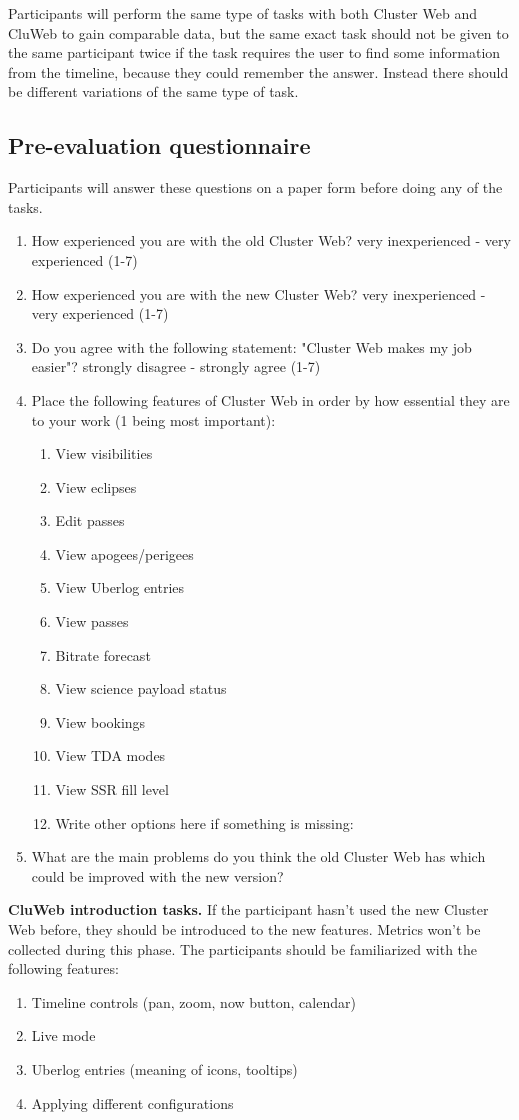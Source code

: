 Participants will perform the same type of tasks with both Cluster Web and CluWeb to gain comparable data, but the same exact task should not be given to the same participant twice if the task requires the user to find some information from the timeline, because they could remember the answer. Instead there should be different variations of the same type of task.

\subsection{Pre-evaluation questionnaire} \label{pre-evaluation}
Participants will answer these questions on a paper form before doing any of the tasks.
\begin{enumerate}
\item How experienced you are with the old Cluster Web? very inexperienced - very experienced (1-7)
\item How experienced you are with the new Cluster Web? very inexperienced - very experienced (1-7)
\item Do you agree with the following statement: "Cluster Web makes my job easier"? strongly disagree - strongly agree (1-7)
\item Place the following features of Cluster Web in order by how essential they are to your work (1 being most important):
\begin{enumerate}
\item View visibilities
\item View eclipses
\item Edit passes
\item View apogees/perigees
\item View Uberlog entries
\item View passes
\item Bitrate forecast
\item View science payload status
\item View bookings
\item View TDA modes
\item View SSR fill level
\item Write other options here if something is missing:
\end{enumerate}
\item What are the main problems do you think the old Cluster Web has which could be improved with the new version?
\end{enumerate}

\textbf{CluWeb introduction tasks.} If the participant hasn't used the new Cluster Web before, they should be introduced to the new features. Metrics won't be collected during this phase. The participants should be familiarized with the following features:
\begin{enumerate}
\item Timeline controls (pan, zoom, now button, calendar)
\item Live mode
\item Uberlog entries (meaning of icons, tooltips)
\item Applying different configurations
\end{enumerate}

